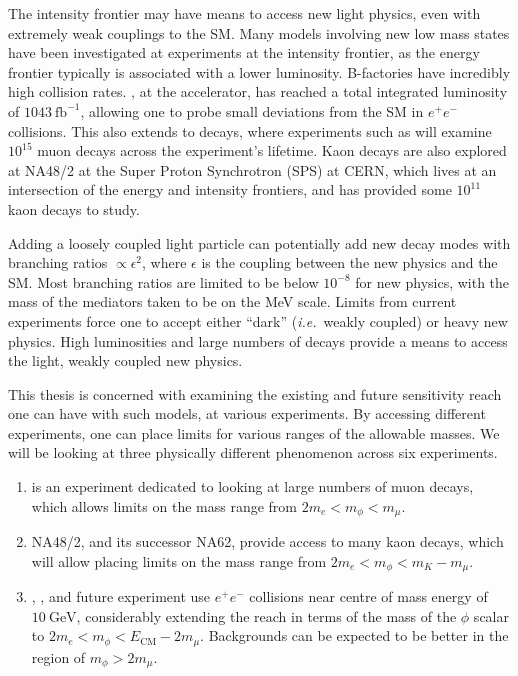 \label{chapter:experiments}

The intensity frontier may have means to access new light physics, even with extremely weak couplings to the SM.
Many models involving new low mass states have been investigated at experiments at the intensity frontier, as the energy frontier typically is associated with a lower luminosity.
B-factories have incredibly high collision rates.
\belle, at the \kekb accelerator, has reached a total integrated luminosity of $1043~\textrm{fb}^{-1}$, allowing one to probe small deviations from the SM in $e^+ e^-$ collisions.
This also extends to decays, where experiments such as \mueee will examine $10^{15}$ muon decays across the experiment's lifetime.
Kaon decays are also explored at NA48/2 at the Super Proton Synchrotron (SPS) at CERN, which lives at an intersection of the energy and intensity frontiers, and has provided some $10^{11}$ kaon decays to study.

Adding a loosely coupled light particle can potentially add new decay modes with branching ratios $\propto \epsilon^2$, where $\epsilon$ is the coupling between the new physics and the SM.
Most branching ratios are limited to be below $10^{-8}$ for new physics, with the mass of the mediators taken to be on the MeV scale.
Limits from current experiments force one to accept either ``dark'' ({\em i.e.}\ weakly coupled) or heavy new physics.
High luminosities and large numbers of decays provide a means to access the light, weakly coupled new physics.

This thesis is concerned with examining the existing and future sensitivity reach one can have with such models, at various experiments.
By accessing different experiments, one can place limits for various ranges of the allowable masses.
We will be looking at three physically different phenomenon across six experiments.
\begin{enumerate}
    \item \mueee is an experiment dedicated to looking at large numbers of muon decays, which allows limits on the mass range from $2 m_e < m_\phi < m_\mu$.
    \item NA48/2, and its successor NA62, provide access to many kaon decays, which will allow placing limits on the mass range from $2 m_e < m_\phi < m_K - m_\mu$.
    \item \babar, \belle, and future experiment \belletwo use $e^+ e^-$ collisions near centre of mass energy of $10~\textrm{GeV}$, considerably extending the reach in terms of the mass of the $\phi$ scalar to $2m_e < m_\phi < E_\textrm{CM} - 2 m_\mu$. Backgrounds can be expected to be better in the region of $m_\phi > 2 m_\mu$.
\end{enumerate}

